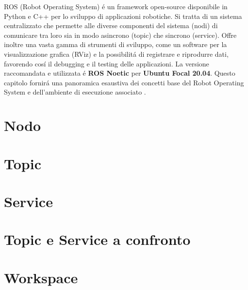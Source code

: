 ROS (Robot Operating System) \'{e} un framework open-source disponibile in Python e C++ per lo sviluppo di applicazioni robotiche. 
Si tratta di un sistema centralizzato che permette alle diverse componenti del sistema (nodi) di comunicare tra loro sia in modo
asincrono (topic) che sincrono (service). Offre inoltre una vasta gamma di strumenti di sviluppo, come un software per la 
visualizzazione grafica (RViz) e la possibilit\'{a} di registrare e riprodurre dati, favorendo cos\'{i} il debugging e il testing 
delle applicazioni. 
La versione raccomandata e utilizzata \'{e} \textbf{ROS Noetic} per \textbf{Ubuntu Focal 20.04}. 
Questo capitolo fornir\'{a} una panoramica esaustiva dei concetti base del Robot Operating System e dell'ambiente di esecuzione 
associato \cite{quigley2009ros}.

\section{Nodo}


\section{Topic}


\section{Service}


\section{Topic e Service a confronto}


\section{Workspace}
